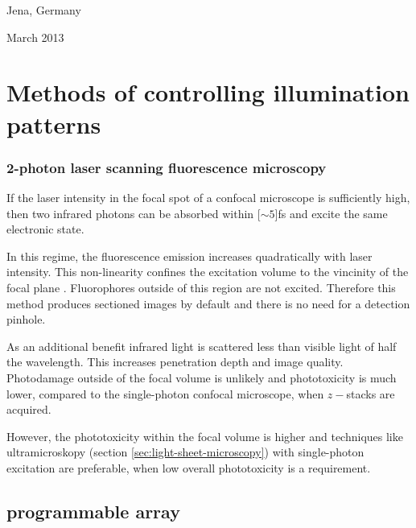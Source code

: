 \documentclass[oneside,a4paper,12pt,BCOR20mm,DIV14]{scrbook} %
\begin{document}
\noindent
Jena, Germany

\noindent
March 2013



\newpage
\tableofcontents
\printnomenclature





\chapter{Methods of controlling illumination patterns}
\label{sec:illum-patterns}
\subsection{2-photon laser scanning fluorescence microscopy}
\label{sec:2-photon}
If the laser intensity in the focal spot of a confocal microscope is
sufficiently high, then two infrared photons can be absorbed within
\unit[$\sim 5$]{fs} and excite the same electronic state.

In this regime, the fluorescence emission increases quadratically with
laser intensity. This non-linearity confines the excitation volume to
the vincinity of the focal plane \citep{Denk1990}. Fluorophores
outside of this region are not excited. Therefore this method produces
sectioned images by default and there is no need for a detection
pinhole.

As an additional benefit infrared light is scattered less than visible
light of half the wavelength. This increases penetration depth and
image quality. Photodamage outside of the focal volume is unlikely and
phototoxicity is much lower, compared to the single-photon confocal
microscope, when $z-$stacks are acquired.

However, the phototoxicity within the focal volume is higher and
techniques like ultramicroskopy (section
\ref{sec:light-sheet-microscopy}) with single-photon excitation are
preferable, when low overall phototoxicity is a requirement.

\section{programmable array}
\cite{Caarls2011}



%
%


\end{document}
